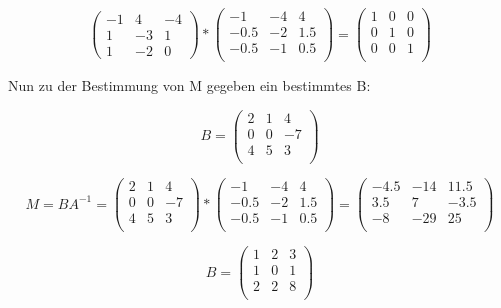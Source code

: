\documentclass{article}
\begin{document}
\[
\begin{pmatrix}
  -1 & 4 & -4 \\
  1 & -3 & 1 \\
  1 & -2 & 0
\end{pmatrix}
*
\begin{pmatrix}
  -1 & -4 & 4 \\
  -0.5 & -2 & 1.5 \\
  -0.5 & -1 & 0.5 \\
\end{pmatrix}
=
\begin{pmatrix}
  1 & 0 & 0 \\
  0 & 1 & 0 \\
  0 & 0 & 1 \\
\end{pmatrix}
\]

Nun zu der Bestimmung von M gegeben ein bestimmtes B:

\[
B =
\begin{pmatrix}
  2 & 1 & 4 \\
  0 & 0 & -7 \\
  4 & 5 & 3 \\
\end{pmatrix}
\]

\[
M = BA^{-1} =
\begin{pmatrix}
  2 & 1 & 4 \\
  0 & 0 & -7 \\
  4 & 5 & 3 \\
\end{pmatrix}
*
\begin{pmatrix}
  -1 & -4 & 4 \\
  -0.5 & -2 & 1.5 \\
  -0.5 & -1 & 0.5 \\
\end{pmatrix}
=
\begin{pmatrix}
  -4.5 & -14 & 11.5 \\
  3.5 & 7 & -3.5 \\
  -8 & -29 & 25 \\
\end{pmatrix}
\]

\[
B =
\begin{pmatrix}
  1 & 2 & 3 \\
  1 & 0 & 1 \\
  2 & 2 & 8 \\
\end{pmatrix}
\]
\end{document}
